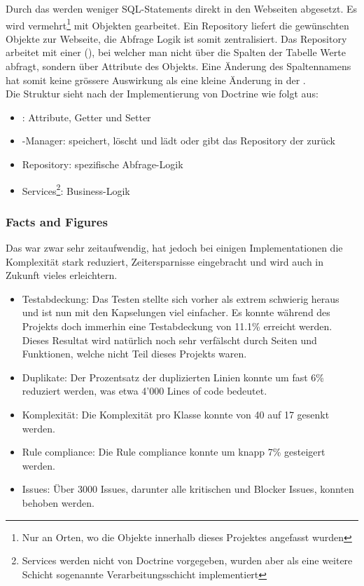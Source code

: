 \FloatBarrier
Durch das  werden weniger SQL-Statements direkt in den Webseiten abgesetzt. Es wird vermehrt\footnote{Nur an Orten, wo die Objekte innerhalb dieses Projektes angefasst wurden} mit Objekten gearbeitet. Ein Repository liefert die gewünschten Objekte zur Webseite, die Abfrage Logik ist somit zentralisiert. Das Repository arbeitet mit einer  (), bei welcher man nicht über die Spalten der Tabelle Werte abfragt, sondern über Attribute des Objekts. Eine Änderung des Spaltennamens hat somit keine grössere Auswirkung als eine kleine Änderung in der .\\

Die Struktur sieht nach der Implementierung von Doctrine wie folgt aus:
\begin{itemize}
\item {}: Attribute, Getter und Setter
\item {}-Manager: speichert, löscht und lädt  oder gibt das Repository der  zurück
\item Repository: spezifische Abfrage-Logik
\item Services\footnote{Services werden nicht von Doctrine vorgegeben, wurden aber als eine weitere Schicht sogenannte Verarbeitungsschicht implementiert}: Business-Logik
\end{itemize}

\newpage
\subsubsection{Facts and Figures}
Das  war zwar sehr zeitaufwendig, hat jedoch bei einigen Implementationen die Komplexität stark reduziert, Zeitersparnisse eingebracht und wird auch in Zukunft vieles erleichtern.
\begin{itemize}
\item Testabdeckung: Das Testen stellte sich vorher als extrem schwierig heraus und ist nun mit den Kapselungen viel einfacher. Es konnte während des Projekts doch immerhin eine Testabdeckung von 11.1\% erreicht werden. Dieses Resultat wird natürlich noch sehr verfälscht durch Seiten und Funktionen, welche nicht Teil dieses Projekts waren.
\item Duplikate: Der Prozentsatz der duplizierten Linien konnte um fast 6\% reduziert werden, was etwa 4'000 Lines of code bedeutet.
\item Komplexität: Die Komplexität pro Klasse konnte von 40 auf 17 gesenkt werden.
\item Rule compliance: Die Rule compliance konnte um knapp 7\% gesteigert werden.
\item Issues: Über 3000 Issues, darunter alle kritischen und Blocker Issues, konnten behoben werden.
\end{itemize}


